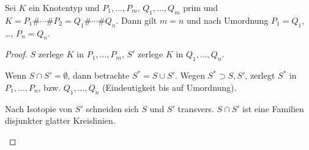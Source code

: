 \begin{st}
    Sei $K$ ein Knotentyp und $P_1, \dotsc, P_m$, $Q_1, \dotsc, Q_m$ prim und
    \begin{math}
        K = P_1 \# \dotsb \# P_2 = Q_1 \# \dotsb \# Q_n.
    \end{math}
    Dann gilt $m = n$ und nach Umordnung $P_1 = Q_1$, \dots, $P_n = Q_n$.
    \begin{proof}
        $S$ zerlege $K$ in $P_1, \dotsc, P_m$, $S'$ zerlege $K$ in $Q_1, \dotsc, Q_n$.
        \begin{seg}[$S \cap S' = \emptyset$]
            Wenn $S \cap S' = \emptyset$, dann betrachte $S^* = S \cup S'$.
            Wegen $S^* \supset S, S'$, zerlegt $S^*$ in $P_1, \dotsc, P_n$, bzw. $Q_1, \dotsc, Q_n$ (Eindeutigkeit bis auf Umordnung).
        \end{seg}
        \begin{seg}
            Nach Isotopie von $S'$ schneiden sich $S$ und $S'$ transvers.
            $S \cap S'$ ist eine Familien disjunkter glatter Kreislinien.

        \end{seg}
    \end{proof}
\end{st}

